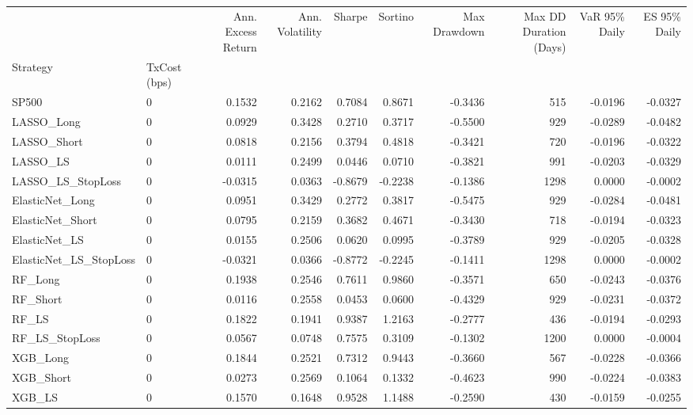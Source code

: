 \begin{tabular}{llrrrrrrrr}
\toprule
 &  & Ann. Excess Return & Ann. Volatility & Sharpe & Sortino & Max Drawdown & Max DD Duration (Days) & VaR 95\% Daily & ES 95\% Daily \\
Strategy & TxCost (bps) &  &  &  &  &  &  &  &  \\
\midrule
SP500 & 0 & 0.1532 & 0.2162 & 0.7084 & 0.8671 & -0.3436 & 515 & -0.0196 & -0.0327 \\
\cline{1-10}
LASSO\_Long & 0 & 0.0929 & 0.3428 & 0.2710 & 0.3717 & -0.5500 & 929 & -0.0289 & -0.0482 \\
\cline{1-10}
LASSO\_Short & 0 & 0.0818 & 0.2156 & 0.3794 & 0.4818 & -0.3421 & 720 & -0.0196 & -0.0322 \\
\cline{1-10}
LASSO\_LS & 0 & 0.0111 & 0.2499 & 0.0446 & 0.0710 & -0.3821 & 991 & -0.0203 & -0.0329 \\
\cline{1-10}
LASSO\_LS\_StopLoss & 0 & -0.0315 & 0.0363 & -0.8679 & -0.2238 & -0.1386 & 1298 & 0.0000 & -0.0002 \\
\cline{1-10}
ElasticNet\_Long & 0 & 0.0951 & 0.3429 & 0.2772 & 0.3817 & -0.5475 & 929 & -0.0284 & -0.0481 \\
\cline{1-10}
ElasticNet\_Short & 0 & 0.0795 & 0.2159 & 0.3682 & 0.4671 & -0.3430 & 718 & -0.0194 & -0.0323 \\
\cline{1-10}
ElasticNet\_LS & 0 & 0.0155 & 0.2506 & 0.0620 & 0.0995 & -0.3789 & 929 & -0.0205 & -0.0328 \\
\cline{1-10}
ElasticNet\_LS\_StopLoss & 0 & -0.0321 & 0.0366 & -0.8772 & -0.2245 & -0.1411 & 1298 & 0.0000 & -0.0002 \\
\cline{1-10}
RF\_Long & 0 & 0.1938 & 0.2546 & 0.7611 & 0.9860 & -0.3571 & 650 & -0.0243 & -0.0376 \\
\cline{1-10}
RF\_Short & 0 & 0.0116 & 0.2558 & 0.0453 & 0.0600 & -0.4329 & 929 & -0.0231 & -0.0372 \\
\cline{1-10}
RF\_LS & 0 & 0.1822 & 0.1941 & 0.9387 & 1.2163 & -0.2777 & 436 & -0.0194 & -0.0293 \\
\cline{1-10}
RF\_LS\_StopLoss & 0 & 0.0567 & 0.0748 & 0.7575 & 0.3109 & -0.1302 & 1200 & 0.0000 & -0.0004 \\
\cline{1-10}
XGB\_Long & 0 & 0.1844 & 0.2521 & 0.7312 & 0.9443 & -0.3660 & 567 & -0.0228 & -0.0366 \\
\cline{1-10}
XGB\_Short & 0 & 0.0273 & 0.2569 & 0.1064 & 0.1332 & -0.4623 & 990 & -0.0224 & -0.0383 \\
\cline{1-10}
XGB\_LS & 0 & 0.1570 & 0.1648 & 0.9528 & 1.1488 & -0.2590 & 430 & -0.0159 & -0.0255 \\

\end{tabular}
